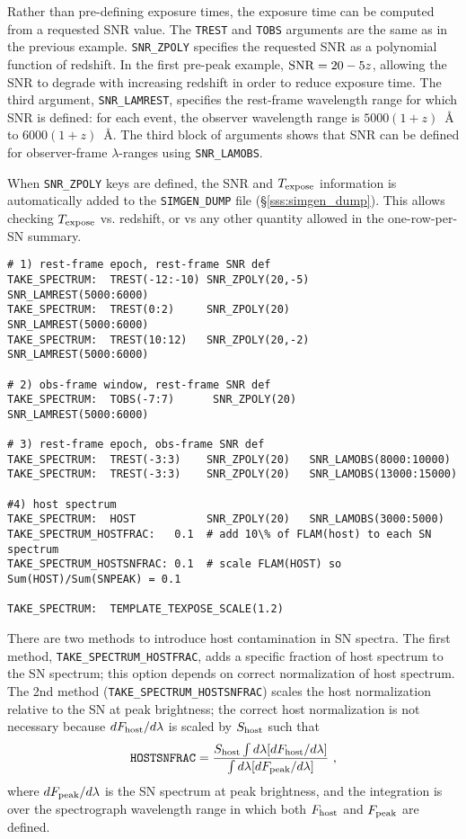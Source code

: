 \documentclass[12pt]{article}
\newcommand{\Texpose}{T_{\rm expose}}
\newcommand{\lam}{\lambda}
\begin{document}
\medskip
\noindent Rather than pre-defining exposure times, the exposure
time can be computed from a requested SNR value.
The {\tt TREST} and {\tt TOBS} arguments are the same as in 
the previous example.
{\tt SNR\_ZPOLY} specifies the requested SNR as a 
polynomial function of redshift. In the first pre-peak
example, ${\rm SNR} = 20-5z$, allowing the SNR to degrade
with increasing redshift in order to reduce exposure time.
The third argument, {\tt SNR\_LAMREST}, specifies the
rest-frame wavelength range for which SNR is defined:
for each event, the observer wavelength range is
$5000(1+z)$~{\AA} to $6000(1+z)$~{\AA}.
The third block of arguments shows that SNR can be
defined for observer-frame $\lambda$-ranges using
{\tt SNR\_LAMOBS}.

When {\tt SNR\_ZPOLY} keys are defined, the SNR and $\Texpose$
information is automatically added to the {\tt SIMGEN\_DUMP}
file (\S\ref{sss:simgen_dump}).
This allows checking $\Texpose$ vs. redshift, or vs
any other quantity allowed in the one-row-per-SN summary.

\begin{Verbatim}[frame=single]
# 1) rest-frame epoch, rest-frame SNR def
TAKE_SPECTRUM:  TREST(-12:-10) SNR_ZPOLY(20,-5)  SNR_LAMREST(5000:6000)
TAKE_SPECTRUM:  TREST(0:2)     SNR_ZPOLY(20)     SNR_LAMREST(5000:6000)
TAKE_SPECTRUM:  TREST(10:12)   SNR_ZPOLY(20,-2)  SNR_LAMREST(5000:6000)

# 2) obs-frame window, rest-frame SNR def
TAKE_SPECTRUM:  TOBS(-7:7)      SNR_ZPOLY(20)    SNR_LAMREST(5000:6000)

# 3) rest-frame epoch, obs-frame SNR def
TAKE_SPECTRUM:  TREST(-3:3)    SNR_ZPOLY(20)   SNR_LAMOBS(8000:10000)
TAKE_SPECTRUM:  TREST(-3:3)    SNR_ZPOLY(20)   SNR_LAMOBS(13000:15000)

#4) host spectrum 
TAKE_SPECTRUM:  HOST           SNR_ZPOLY(20)   SNR_LAMOBS(3000:5000)
TAKE_SPECTRUM_HOSTFRAC:   0.1  # add 10\% of FLAM(host) to each SN spectrum
TAKE_SPECTRUM_HOSTSNFRAC: 0.1  # scale FLAM(HOST) so Sum(HOST)/Sum(SNPEAK) = 0.1

TAKE_SPECTRUM:  TEMPLATE_TEXPOSE_SCALE(1.2)
\end{Verbatim}


\medskip
\newcommand{\scaleFlamHost}{S_{\rm host}}
\newcommand{\dFlamHost}{dF_{\rm host}/d\lam}
\newcommand{\dFlamPeak}{dF_{\rm peak}/d\lam}
There are two methods to introduce host contamination in SN spectra.
The first method, {\tt TAKE\_SPECTRUM\_HOSTFRAC}, adds a specific fraction
of host spectrum to the SN spectrum; this option depends on correct
normalization of host spectrum. 
The 2nd method ({\tt TAKE\_SPECTRUM\_HOSTSNFRAC}) scales the host 
normalization relative to the SN at peak brightness;
the correct host normalization is not necessary because 
$\dFlamHost$ is scaled by $\scaleFlamHost$ such that
\begin{equation}
   {\rm\tt HOSTSNFRAC} =      
    \frac{\scaleFlamHost\int d\lam [\dFlamHost]}{ \int d\lam [\dFlamPeak ]}~,
\end{equation}
%
where $\dFlamPeak$ is the SN spectrum at peak brightness,
and the integration is over the spectrograph wavelength range
in which both $F_{\rm host}$ and $F_{\rm peak}$ are defined.
\end{document}

